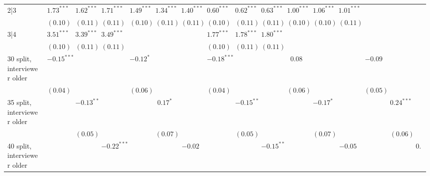\begin{table}
\begin{center}
\begin{threeparttable}
\begin{tabular}{l c c c c c c c c c c c c c c c}
2|3                             & $1.73^{***}$  & $1.62^{***}$  & $1.71^{***}$  & $1.49^{***}$  & $1.34^{***}$  & $1.40^{***}$  & $0.60^{***}$  & $0.62^{***}$  & $0.63^{***}$  & $1.00^{***}$  & $1.06^{***}$  & $1.01^{***}$  &               &               &               \\
                                & $(0.10)$      & $(0.11)$      & $(0.11)$      & $(0.10)$      & $(0.11)$      & $(0.11)$      & $(0.10)$      & $(0.11)$      & $(0.11)$      & $(0.10)$      & $(0.10)$      & $(0.11)$      &               &               &               \\
3|4                             & $3.51^{***}$  & $3.39^{***}$  & $3.49^{***}$  &               &               &               & $1.77^{***}$  & $1.78^{***}$  & $1.80^{***}$  &               &               &               &               &               &               \\
                                & $(0.10)$      & $(0.11)$      & $(0.11)$      &               &               &               & $(0.10)$      & $(0.11)$      & $(0.11)$      &               &               &               &               &               &               \\
30 split, interviewer older     & $-0.15^{***}$ &               &               & $-0.12^{*}$   &               &               & $-0.18^{***}$ &               &               & $0.08$        &               &               & $-0.09$       &               &               \\
                                & $(0.04)$      &               &               & $(0.06)$      &               &               & $(0.04)$      &               &               & $(0.06)$      &               &               & $(0.05)$      &               &               \\
35 split, interviewer older     &               & $-0.13^{**}$  &               &               & $0.17^{*}$    &               &               & $-0.15^{**}$  &               &               & $-0.17^{*}$   &               &               & $0.24^{***}$  &               \\
                                &               & $(0.05)$      &               &               & $(0.07)$      &               &               & $(0.05)$      &               &               & $(0.07)$      &               &               & $(0.06)$      &               \\
40 split, interviewer older     &               &               & $-0.22^{***}$ &               &               & $-0.02$       &               &               & $-0.15^{**}$  &               &               & $-0.05$       &               &               & $0.03$        \\

\end{tabular}
\end{threeparttable}
\end{center}
\end{table}
